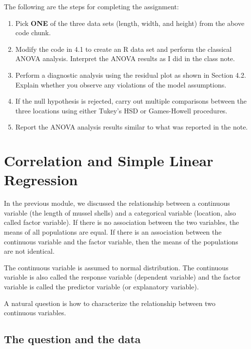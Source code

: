 \documentclass[
]{book}
\begin{document}
The following are the steps for completing the assignment:

\begin{enumerate}
\def\labelenumi{\arabic{enumi}.}
\item
  Pick \textbf{ONE} of the three data sets (length, width, and height) from the above code chunk.
\item
  Modify the code in 4.1 to create an R data set and perform the classical ANOVA analysis. Interpret the ANOVA results as I did in the class note.
\item
  Perform a diagnostic analysis using the residual plot as shown in Section 4.2. Explain whether you observe any violations of the model assumptions.
\item
  If the null hypothesis is rejected, carry out multiple comparisons between the three locations using either Tukey's HSD or Games-Howell procedures.
\item
  Report the ANOVA analysis results similar to what was reported in the note.
\end{enumerate}

\hypertarget{correlation-and-simple-linear-regression}{%
\chapter{Correlation and Simple Linear Regression}\label{correlation-and-simple-linear-regression}}

In the previous module, we discussed the relationship between a continuous variable (the length of mussel shells) and a categorical variable (location, also called factor variable). If there is no association between the two variables, the means of all populations are equal. If there is an association between the continuous variable and the factor variable, then the means of the populations are not identical.

The continuous variable is assumed to normal distribution. The continuous variable is also called the response variable (dependent variable) and the factor variable is called the predictor variable (or explanatory variable).

A natural question is how to characterize the relationship between two continuous variables.

\hypertarget{the-question-and-the-data}{%
\section{The question and the data}\label{the-question-and-the-data}}
\end{document}

